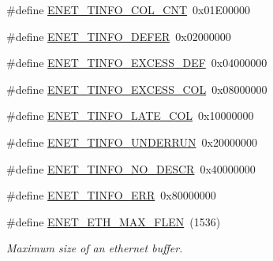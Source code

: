 \begin{DoxyCompactItemize}
$$\item 
\#define \hyperlink{group___e_n_e_t__17_x_x__40_x_x_gab483256508551c09e411706f45c81c70}{E\+N\+E\+T\+\_\+\+T\+I\+N\+F\+O\+\_\+\+C\+O\+L\+\_\+\+C\+N\+T}~0x01\+E00000
\item 
\#define \hyperlink{group___e_n_e_t__17_x_x__40_x_x_gace4cfc3d6e1db023f33281b1593a97ae}{E\+N\+E\+T\+\_\+\+T\+I\+N\+F\+O\+\_\+\+D\+E\+F\+E\+R}~0x02000000
\item 
\#define \hyperlink{group___e_n_e_t__17_x_x__40_x_x_ga6572529bff7597c6951184bd325195da}{E\+N\+E\+T\+\_\+\+T\+I\+N\+F\+O\+\_\+\+E\+X\+C\+E\+S\+S\+\_\+\+D\+E\+F}~0x04000000
\item 
\#define \hyperlink{group___e_n_e_t__17_x_x__40_x_x_ga5c85ac99ceb6444c5beb2afbcafee2ec}{E\+N\+E\+T\+\_\+\+T\+I\+N\+F\+O\+\_\+\+E\+X\+C\+E\+S\+S\+\_\+\+C\+O\+L}~0x08000000
\item 
\#define \hyperlink{group___e_n_e_t__17_x_x__40_x_x_ga28ff3c0b58337f73dcf19af5c77b1813}{E\+N\+E\+T\+\_\+\+T\+I\+N\+F\+O\+\_\+\+L\+A\+T\+E\+\_\+\+C\+O\+L}~0x10000000
\item 
\#define \hyperlink{group___e_n_e_t__17_x_x__40_x_x_ga1c695274991bb04562d674a2869bd2c7}{E\+N\+E\+T\+\_\+\+T\+I\+N\+F\+O\+\_\+\+U\+N\+D\+E\+R\+R\+U\+N}~0x20000000
\item 
\#define \hyperlink{group___e_n_e_t__17_x_x__40_x_x_ga217a2ea7ea34a8ce88c5252d838943ba}{E\+N\+E\+T\+\_\+\+T\+I\+N\+F\+O\+\_\+\+N\+O\+\_\+\+D\+E\+S\+C\+R}~0x40000000
\item 
\#define \hyperlink{group___e_n_e_t__17_x_x__40_x_x_gaeb11bfbbf43a3c82fb88e56a5e68e7bc}{E\+N\+E\+T\+\_\+\+T\+I\+N\+F\+O\+\_\+\+E\+R\+R}~0x80000000
\item 
\hypertarget{group___e_n_e_t__17_x_x__40_x_x_gacba3b6d78224fc1ee628088edbff5609}{\#define \hyperlink{group___e_n_e_t__17_x_x__40_x_x_gacba3b6d78224fc1ee628088edbff5609}{E\+N\+E\+T\+\_\+\+E\+T\+H\+\_\+\+M\+A\+X\+\_\+\+F\+L\+E\+N}~(1536)}\label{group___e_n_e_t__17_x_x__40_x_x_gacba3b6d78224fc1ee628088edbff5609}

\begin{DoxyCompactList}\small\item\em Maximum size of an ethernet buffer. \end{DoxyCompactList}\end{DoxyCompactItemize}
